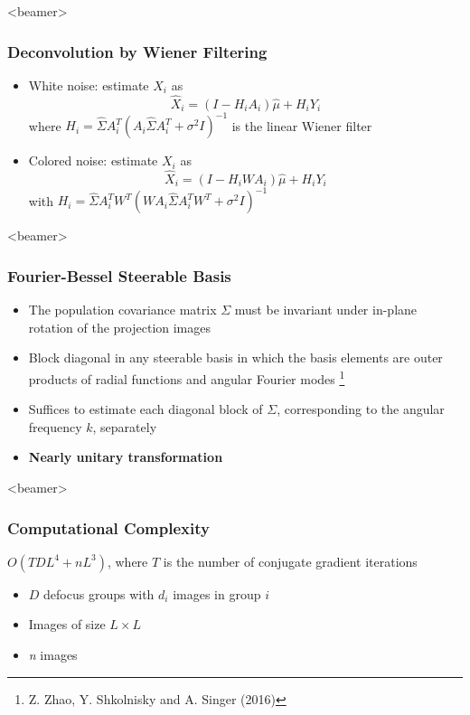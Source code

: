 \documentclass{beamer}
\newcommand\blfootnote[1]{%
  \begingroup
  \renewcommand\thefootnote{}\footnote{#1}%
  \addtocounter{footnote}{-1}%
  \endgroup
}
\begin{document}
\begin{frame}<beamer>
\frametitle{Deconvolution by Wiener Filtering}

\begin{itemize}
\item White noise: estimate $X_i$ as
\begin{equation*}
\hat X_i = (I-H_iA_{i})\hat\mu + H_iY_i 
\end{equation*}
where $H_i = \hat \Sigma A_{i}^T ( A_{i} \hat \Sigma A_{i}^T + \sigma^2 
I)^{-1} $ is the linear Wiener filter  
\item Colored noise: estimate $X_i$ as
\begin{equation*}
\hat X_i = (I-H_iWA_{i})\hat\mu + H_iY_i 
\end{equation*}
with $H_i = \hat \Sigma A_{i}^T W^T (W A_{i} \hat \Sigma A_{i}^T W^T 
+ \sigma^2 I)^{-1}$
\end{itemize}
\end{frame}


\begin{frame}<beamer>
\frametitle{Fourier-Bessel Steerable Basis }
\begin{itemize}[]
\item The population covariance matrix $\Sigma$ must be invariant under in-plane 
rotation of the projection images
\item Block diagonal in any steerable basis in which the 
basis elements are outer products of radial functions and angular Fourier modes\blfootnote{Z. Zhao, Y. Shkolnisky and A. Singer (2016)}
\item Suffices to 
estimate each diagonal block of $\Sigma$, corresponding to the angular frequency $k$, separately
\item \textbf{Nearly unitary transformation}
\end{itemize}
\end{frame}

\begin{frame}<beamer>
\frametitle{Computational Complexity}
$O(TDL^4 + nL^3)$, where $T$ is the number of conjugate gradient iterations
\begin{itemize}
\item $D$ defocus groups with $d_i$ images in group $i$
\item Images of size $L \times L$
\item \textit{n} images
\end{itemize}
\end{frame}
\end{document}
